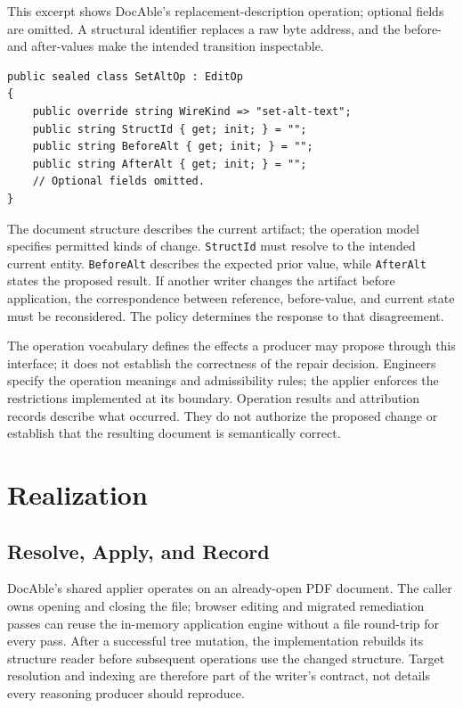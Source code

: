 This excerpt shows DocAble's replacement-description operation; optional fields are omitted. A structural identifier replaces a raw byte address, and the before- and after-values make the intended transition inspectable.

\begin{verbatim}
public sealed class SetAltOp : EditOp
{
    public override string WireKind => "set-alt-text";
    public string StructId { get; init; } = "";
    public string BeforeAlt { get; init; } = "";
    public string AfterAlt { get; init; } = "";
    // Optional fields omitted.
}
\end{verbatim}

The document structure describes the current artifact; the operation model specifies permitted kinds of change. \texttt{StructId} must resolve to the intended current entity. \texttt{BeforeAlt} describes the expected prior value, while \texttt{AfterAlt} states the proposed result. If another writer changes the artifact before application, the correspondence between reference, before-value, and current state must be reconsidered. The policy determines the response to that disagreement.

The operation vocabulary defines the effects a producer may propose through this interface; it does not establish the correctness of the repair decision. Engineers specify the operation meanings and admissibility rules; the applier enforces the restrictions implemented at its boundary. Operation results and attribution records describe what occurred. They do not authorize the proposed change or establish that the resulting document is semantically correct.

\section{Realization}

\subsection*{Resolve, Apply, and Record}

DocAble's shared applier operates on an already-open PDF document. The caller owns opening and closing the file; browser editing and migrated remediation passes can reuse the in-memory application engine without a file round-trip for every pass. After a successful tree mutation, the implementation rebuilds its structure reader before subsequent operations use the changed structure. Target resolution and indexing are therefore part of the writer's contract, not details every reasoning producer should reproduce.

